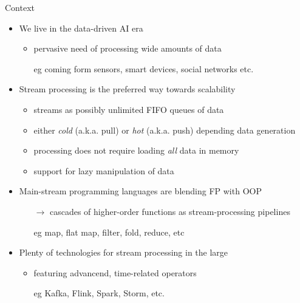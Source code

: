 \documentclass[presentation]{beamer}
\begin{document}
\begin{frame}[allowframebreaks]{Context}
    
    \begin{itemize}
        \item We live in the \alert{data-driven AI} era
        \begin{itemize}
            \item pervasive need of processing wide amounts of data
            \item[eg] coming form sensors, smart devices, social networks etc.
        \end{itemize}
        
        \bigskip
        
        \item Stream processing is the preferred way towards \alert{scalability}
        \begin{itemize}
            \item streams as possibly \alert{unlimited FIFO queues} of data
            \item either \emph{cold} (a.k.a. \alert{pull}) or \emph{hot} (a.k.a. \alert{push}) depending data \alert{generation}
            \item processing does not require loading \emph{all} data in memory
            \item support for \alert{lazy} manipulation of data
        \end{itemize}
        
        \framebreak
        
        \item Main-stream programming languages are blending FP with OOP
        \begin{itemize}
            \item[$\rightarrow$] cascades of higher-order functions as stream-processing pipelines
            \item[eg] map, flat map, filter, fold, reduce, etc 
        \end{itemize}
        
        \bigskip
        
        \item Plenty of technologies for stream processing \alert{in the large}
        \begin{itemize}
            \item featuring advancend, time-related operators 
            \item[eg] Kafka, Flink, Spark, Storm, etc.
        \end{itemize}
        
    \end{itemize}
\end{frame}
\end{document}

